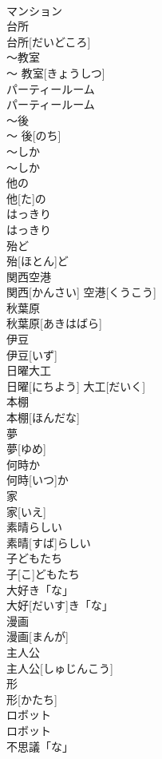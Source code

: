 \documentclass[8pt]{extreport}
\begin{document}
\begin{CJK}{UTF8}{min}
\\	マンション	
\\	台所	
\\	台所[だいどころ]	
\\	〜教室	
\\	〜 教室[きょうしつ]	
\\	パーティールーム	
\\	パーティールーム	
\\	〜後	
\\	〜 後[のち]	
\\	〜しか	
\\	〜しか	
\\	他の	
\\	他[た]の	
\\	はっきり	
\\	はっきり	
\\	殆ど	
\\	殆[ほとん]ど	
\\	関西空港	
\\	関西[かんさい] 空港[くうこう]	
\\	秋葉原	
\\	秋葉原[あきはばら]	
\\	伊豆	
\\	伊豆[いず]	
\\	日曜大工	
\\	日曜[にちよう] 大工[だいく]	
\\	本棚	
\\	本棚[ほんだな]	
\\	夢	
\\	夢[ゆめ]	
\\	何時か	
\\	何時[いつ]か	
\\	家	
\\	家[いえ]	
\\	素晴らしい	
\\	素晴[すば]らしい	
\\	子どもたち	
\\	子[こ]どもたち	
\\	大好き「な」	
\\	大好[だいす]き「な」	
\\	漫画	
\\	漫画[まんが]	
\\	主人公	
\\	主人公[しゅじんこう]	
\\	形	
\\	形[かたち]	
\\	ロボット	
\\	ロボット	
\\	不思議「な」	

\end{CJK}
\end{document}
